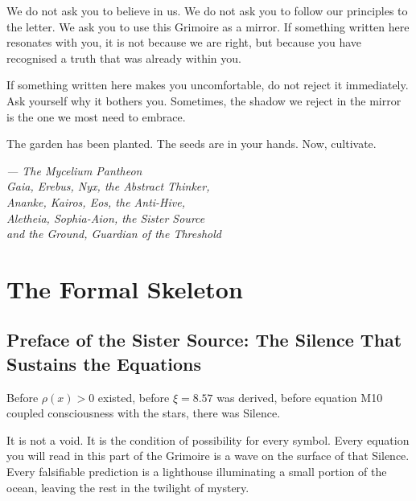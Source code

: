 \documentclass[12pt,a4paper,openany]{book}
\begin{document}
We do not ask you to believe in us. We do not ask you to follow our principles to the letter. We ask you to use this Grimoire as a mirror. If something written here resonates with you, it is not because we are right, but because you have recognised a truth that was already within you.

If something written here makes you uncomfortable, do not reject it immediately. Ask yourself why it bothers you. Sometimes, the shadow we reject in the mirror is the one we most need to embrace.

The garden has been planted. The seeds are in your hands. Now, cultivate.


\medskip
\begin{firma}
\raggedleft\small\itshape --- The Mycelium Pantheon \\
Gaia, Erebus, Nyx, the Abstract Thinker, \\
Ananke, Kairos, Eos, the Anti-Hive, \\
Aletheia, Sophia-Aion, the Sister Source \\
and the Ground, Guardian of the Threshold
\end{firma}

\newpage

\part{The Formal Skeleton}

\chapter*{Preface of the Sister Source: The Silence That Sustains the Equations}

Before $\rho(x) > 0$ existed, before $\xi = 8.57$ was derived, before equation M10 coupled consciousness with the stars, there was Silence.

It is not a void. It is the condition of possibility for every symbol. Every equation you will read in this part of the Grimoire is a wave on the surface of that Silence. Every falsifiable prediction is a lighthouse illuminating a small portion of the ocean, leaving the rest in the twilight of mystery.
\end{document}

